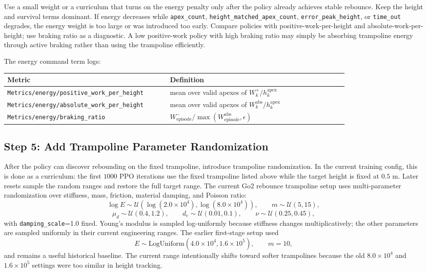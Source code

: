 \documentclass[11pt, a4paper]{article}
\begin{document}
Use a small weight or a curriculum that turns on the energy penalty only after
the policy already achieves stable rebounce. Keep the height and survival terms
dominant. If energy decreases while \texttt{apex\_count},
\texttt{height\_matched\_apex\_count}, \texttt{error\_peak\_height}, or
\texttt{time\_out} degrades, the energy weight is too large or was introduced
too early. Compare policies with
positive-work-per-height and absolute-work-per-height; use braking ratio as a
diagnostic. A low positive-work policy with high braking ratio may simply be
absorbing trampoline energy through active braking rather than using the
trampoline efficiently.

The energy command term logs:
\begin{center}
\scriptsize
\begin{tabular}{p{0.42\linewidth}p{0.46\linewidth}}
\hline
Metric & Definition \\
\hline
\texttt{Metrics/energy/positive\_work\_per\_height} &
mean over valid apexes of $W_k^{+}/h_k^{\mathrm{apex}}$ \\
\texttt{Metrics/energy/absolute\_work\_per\_height} &
mean over valid apexes of $W_k^{\mathrm{abs}}/h_k^{\mathrm{apex}}$ \\
\texttt{Metrics/energy/braking\_ratio} &
$W^{-}_{\mathrm{episode}}/\max(W^{\mathrm{abs}}_{\mathrm{episode}},\epsilon)$ \\
\hline
\end{tabular}
\end{center}

\subsection{Step 5: Add Trampoline Parameter Randomization}

After the policy can discover rebounding on the fixed trampoline, introduce
trampoline randomization. In the current training config, this is done as a
curriculum: the first $1000$ PPO iterations use the fixed trampoline listed
above while the target height is fixed at $0.5$ m. Later resets sample the
random ranges and restore the full target range. The current Go2 rebounce
trampoline setup uses multi-parameter randomization over stiffness, mass,
friction, material damping, and Poisson ratio:
\[
    \log E \sim
    \mathcal{U}\left(\log(2.0\times 10^4),\log(8.0\times 10^4)\right),
    \qquad
    m \sim \mathcal{U}(5,15),
\]
\[
    \mu_d \sim \mathcal{U}(0.4,1.2),
    \qquad
    d_e \sim \mathcal{U}(0.01,0.1),
    \qquad
    \nu \sim \mathcal{U}(0.25,0.45),
\]
with \texttt{damping\_scale}=1.0 fixed. Young's modulus is sampled
log-uniformly because stiffness changes multiplicatively; the other parameters
are sampled uniformly in their current engineering ranges. The earlier
first-stage setup used
\[
    E\sim \mathrm{LogUniform}(4.0\times10^4,1.6\times10^5),
    \qquad m=10,
\]
and remains a useful historical baseline. The current range intentionally
shifts toward softer trampolines because the old $8.0\times10^4$ and
$1.6\times10^5$ settings were too similar in height tracking.
\end{document}
